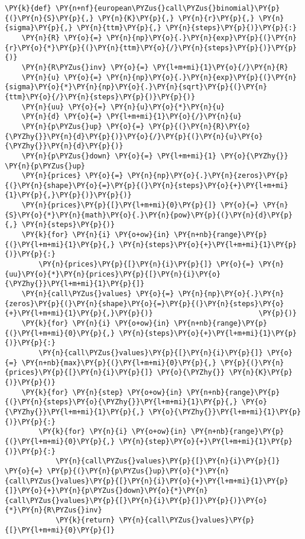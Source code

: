 \begin{codebox}
\begin{Verbatim}[commandchars=\\\{\}]
\PY{k}{def} \PY{n+nf}{european\PYZus{}call\PYZus{}binomial}\PY{p}{(}\PY{n}{S}\PY{p}{,} \PY{n}{K}\PY{p}{,} \PY{n}{r}\PY{p}{,} \PY{n}{sigma}\PY{p}{,} \PY{n}{ttm}\PY{p}{,} \PY{n}{steps}\PY{p}{)}\PY{p}{:}
    \PY{n}{R} \PY{o}{=} \PY{n}{np}\PY{o}{.}\PY{n}{exp}\PY{p}{(}\PY{n}{r}\PY{o}{*}\PY{p}{(}\PY{n}{ttm}\PY{o}{/}\PY{n}{steps}\PY{p}{)}\PY{p}{)}
    \PY{n}{R\PYZus{}inv} \PY{o}{=} \PY{l+m+mi}{1}\PY{o}{/}\PY{n}{R}
    \PY{n}{u} \PY{o}{=} \PY{n}{np}\PY{o}{.}\PY{n}{exp}\PY{p}{(}\PY{n}{sigma}\PY{o}{*}\PY{n}{np}\PY{o}{.}\PY{n}{sqrt}\PY{p}{(}\PY{n}{ttm}\PY{o}{/}\PY{n}{steps}\PY{p}{)}\PY{p}{)}
    \PY{n}{uu} \PY{o}{=} \PY{n}{u}\PY{o}{*}\PY{n}{u}
    \PY{n}{d} \PY{o}{=} \PY{l+m+mi}{1}\PY{o}{/}\PY{n}{u}
    \PY{n}{p\PYZus{}up} \PY{o}{=} \PY{p}{(}\PY{n}{R}\PY{o}{\PYZhy{}}\PY{n}{d}\PY{p}{)}\PY{o}{/}\PY{p}{(}\PY{n}{u}\PY{o}{\PYZhy{}}\PY{n}{d}\PY{p}{)}
    \PY{n}{p\PYZus{}down} \PY{o}{=} \PY{l+m+mi}{1} \PY{o}{\PYZhy{}} \PY{n}{p\PYZus{}up}
    \PY{n}{prices} \PY{o}{=} \PY{n}{np}\PY{o}{.}\PY{n}{zeros}\PY{p}{(}\PY{n}{shape}\PY{o}{=}\PY{p}{(}\PY{n}{steps}\PY{o}{+}\PY{l+m+mi}{1}\PY{p}{,}\PY{p}{)}\PY{p}{)}
    \PY{n}{prices}\PY{p}{[}\PY{l+m+mi}{0}\PY{p}{]} \PY{o}{=} \PY{n}{S}\PY{o}{*}\PY{n}{math}\PY{o}{.}\PY{n}{pow}\PY{p}{(}\PY{n}{d}\PY{p}{,} \PY{n}{steps}\PY{p}{)}
    \PY{k}{for} \PY{n}{i} \PY{o+ow}{in} \PY{n+nb}{range}\PY{p}{(}\PY{l+m+mi}{1}\PY{p}{,} \PY{n}{steps}\PY{o}{+}\PY{l+m+mi}{1}\PY{p}{)}\PY{p}{:}
        \PY{n}{prices}\PY{p}{[}\PY{n}{i}\PY{p}{]} \PY{o}{=} \PY{n}{uu}\PY{o}{*}\PY{n}{prices}\PY{p}{[}\PY{n}{i}\PY{o}{\PYZhy{}}\PY{l+m+mi}{1}\PY{p}{]}   
    \PY{n}{call\PYZus{}values} \PY{o}{=} \PY{n}{np}\PY{o}{.}\PY{n}{zeros}\PY{p}{(}\PY{n}{shape}\PY{o}{=}\PY{p}{(}\PY{n}{steps}\PY{o}{+}\PY{l+m+mi}{1}\PY{p}{,}\PY{p}{)}                         \PY{p}{)}
    \PY{k}{for} \PY{n}{i} \PY{o+ow}{in} \PY{n+nb}{range}\PY{p}{(}\PY{l+m+mi}{0}\PY{p}{,} \PY{n}{steps}\PY{o}{+}\PY{l+m+mi}{1}\PY{p}{)}\PY{p}{:}
        \PY{n}{call\PYZus{}values}\PY{p}{[}\PY{n}{i}\PY{p}{]} \PY{o}{=} \PY{n+nb}{max}\PY{p}{(}\PY{l+m+mi}{0}\PY{p}{,} \PY{p}{(}\PY{n}{prices}\PY{p}{[}\PY{n}{i}\PY{p}{]} \PY{o}{\PYZhy{}} \PY{n}{K}\PY{p}{)}\PY{p}{)} 
    \PY{k}{for} \PY{n}{step} \PY{o+ow}{in} \PY{n+nb}{range}\PY{p}{(}\PY{n}{steps}\PY{o}{\PYZhy{}}\PY{l+m+mi}{1}\PY{p}{,} \PY{o}{\PYZhy{}}\PY{l+m+mi}{1}\PY{p}{,} \PY{o}{\PYZhy{}}\PY{l+m+mi}{1}\PY{p}{)}\PY{p}{:}
        \PY{k}{for} \PY{n}{i} \PY{o+ow}{in} \PY{n+nb}{range}\PY{p}{(}\PY{l+m+mi}{0}\PY{p}{,} \PY{n}{step}\PY{o}{+}\PY{l+m+mi}{1}\PY{p}{)}\PY{p}{:}
            \PY{n}{call\PYZus{}values}\PY{p}{[}\PY{n}{i}\PY{p}{]} \PY{o}{=} \PY{p}{(}\PY{n}{p\PYZus{}up}\PY{o}{*}\PY{n}{call\PYZus{}values}\PY{p}{[}\PY{n}{i}\PY{o}{+}\PY{l+m+mi}{1}\PY{p}{]}\PY{o}{+}\PY{n}{p\PYZus{}down}\PY{o}{*}\PY{n}{call\PYZus{}values}\PY{p}{[}\PY{n}{i}\PY{p}{]}\PY{p}{)}\PY{o}{*}\PY{n}{R\PYZus{}inv}
            \PY{k}{return} \PY{n}{call\PYZus{}values}\PY{p}{[}\PY{l+m+mi}{0}\PY{p}{]}
		

\end{Verbatim}
\end{codebox}
